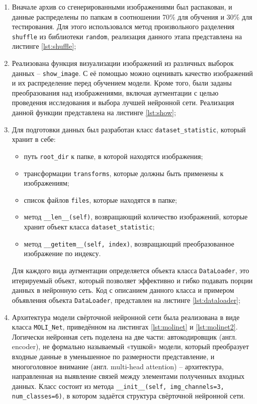 \documentclass[14pt, russian]{scrartcl}
\begin{document}
\begin{enumerate} 
    \item Вначале архив со сгенерированными изображениями был распакован, и данные распределены по папкам в соотношении 70\% для обучения и 30\% для тестирования. Для этого использовался метод произвольного разделения \verb|shuffle| из библиотеки \verb|random|\cite{random}, реализация данного этапа представлена на листинге \ref{lst:shuffle};
    \item Реализована функция визуализации изображений из различных выборок данных -- \verb|show_image|. С её помощью можно оценивать качество изображений и их распределение перед обучением модели. Кроме того, были заданы преобразования над изображениями, включая аугментации с целью проведения исследования и выбора лучшей нейронной сети. Реализация данной функции представлена на листинге \ref{lst:show};
    \item Для подготовки данных был разработан класс \verb|dataset_statistic|, который хранит в себе:
    \begin{itemize}
        \item путь \verb|root_dir| к папке, в которой находятся изображения;
        \item трансформации \verb|transforms|, которые должны быть применены к изображениям;
        \item список файлов \verb|files|, которые находятся в папке;
        \item метод \verb|__len__(self)|, возвращающий количество изображений, которые хранит объект класса \verb|dataset_statistic|;
        \item метод \verb|__getitem__(self, index)|, возвращающий преобразованное изображение по индексу.
    \end{itemize}
    Для каждого вида аугментации определяется объекта класса \verb|DataLoader|, это итерируемый объект, который позволяет эффективно и гибко подавать порции данных в нейронную сеть. Код с описанием данного класса и примером объявления объекта \verb|DataLoader|, представлен на листинге \ref{lst:dataloader};

    \item Архитектура модели свёрточной нейронной сети была реализована в виде класса \verb|MOLI_Net|, приведённом на листингах \ref{lst:molinet} и \ref{lst:molinet2}. Логически нейронная сеть поделена на две части: автокодировщик (англ. encoder), не формально называемый «тушкой» модели, который преобразует входные данные в уменьшенное по размерности представление, и многоголовное внимание (англ. multi-head attention) -- архитектура, направленная на выявление связей между элементами полученных входных данных. Класс состоит из метода \verb|__init__(self, img_channels=3, num_classes=6)|, в котором задаётся структура свёрточной нейронной сети. 
    

\end{enumerate}
\end{document}
